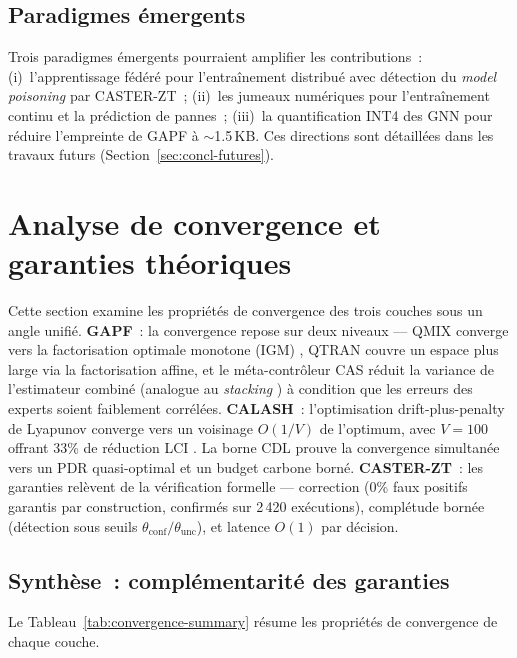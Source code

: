 \subsection{Paradigmes émergents}

Trois paradigmes émergents pourraient amplifier les contributions~: (i)~l'apprentissage fédéré \cite{McMahan2017FedAvg} pour l'entraînement distribué avec détection du \emph{model poisoning} par CASTER-ZT~; (ii)~les jumeaux numériques \cite{Nguyen2024DTORAN} pour l'entraînement continu et la prédiction de pannes~; (iii)~la quantification INT4 des GNN \cite{Bianchi2021QuantizedGNN} pour réduire l'empreinte de GAPF à $\sim$1.5\,KB. Ces directions sont détaillées dans les travaux futurs (Section~\ref{sec:concl-futures}).


\section{Analyse de convergence et garanties théoriques}\label{sec:disc-convergence}

Cette section examine les propriétés de convergence des trois couches sous un angle unifié. \textbf{GAPF}~: la convergence repose sur deux niveaux --- QMIX converge vers la factorisation optimale monotone (IGM) \cite{rashid2018qmix}, QTRAN couvre un espace plus large via la factorisation affine, et le méta-contrôleur CAS réduit la variance de l'estimateur combiné (analogue au \emph{stacking} \cite{Wolpert1992Stacking}) à condition que les erreurs des experts soient faiblement corrélées. \textbf{CALASH}~: l'optimisation drift-plus-penalty de Lyapunov converge vers un voisinage $O(1/V)$ de l'optimum, avec $V=100$ offrant 33\% de réduction LCI \cite{neely2010lyapunov}. La borne CDL prouve la convergence simultanée vers un PDR quasi-optimal et un budget carbone borné. \textbf{CASTER-ZT}~: les garanties relèvent de la vérification formelle --- correction (0\% faux positifs garantis par construction, confirmés sur 2\,420 exécutions), complétude bornée (détection sous seuils $\theta_\mathrm{conf}/\theta_\mathrm{unc}$), et latence $O(1)$ par décision.

\subsection{Synthèse~: complémentarité des garanties}

Le Tableau~\ref{tab:convergence-summary} résume les propriétés de convergence de chaque couche.

